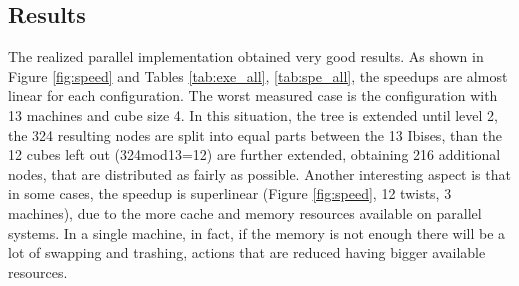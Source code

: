 \documentclass[a4paper]{article}
\begin{document}
\subsection{Results}
\label{sec:results}
The realized parallel implementation obtained very good results. As shown in Figure \ref{fig:speed} and Tables \ref{tab:exe_all}, \ref{tab:spe_all}, the speedups are almost linear for each configuration. The worst measured case is the configuration with 13 machines and cube size 4. In this situation, the tree is extended until level 2, the 324 resulting nodes are split into equal parts between the 13 Ibises, than the 12 cubes left out (324mod13=12) are further extended, obtaining 216 additional nodes, that are distributed as fairly as possible. Another interesting aspect is that in some cases, the speedup is superlinear (Figure \ref{fig:speed}, 12 twists, 3 machines), due to the more cache and memory resources available on parallel systems. In a single machine, in fact, if the memory is not enough there will be a lot of swapping and trashing, actions that are reduced having bigger available resources.
\end{document}
